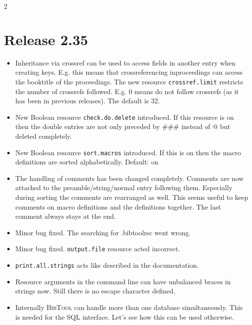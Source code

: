 \documentclass[11pt,a4paper]{scrartcl}
\newcommand\rsc[1]{\texttt{#1}}
\newcommand\File[1]{\textsf{#1}}
\newcommand\BibTool{\textsc{BibTool}}
\newenvironment{Releases}{\begin{multicols}2\RaggedRight}{\end{multicols}}
\newenvironment{Release}[2]{%
  \def\tmp{#2}%
  \section*{Release #1 \ifx\tmp\empty\else{\normalsize[#2]}\fi}
  \begin{itemize}
}{\end{itemize}}
\newenvironment{Fix}[1]{\item }{}
\newenvironment{New}[1]{\item }{}
\newenvironment{Update}[1]{\item }{}
\begin{document}
\begin{Releases}
 \begin{Release}{2.35}{}
  \begin{Update}{gene}
    Inheritance via crossref can be used to access fields in another
    entry when creating keys. E.g. this means that crossreferencing
    inproceedings can access the booktitle of the proceedings. The new
    resource \rsc{crossref.limit} restricts the number of crossrefs
    followed. E.g. 0 means do not follow crossrefs (as it has been in
    previous releases). The default is 32.
  \end{Update}
  \begin{New}{gene}
    New Boolean resource \rsc{check.do.delete} introduced. If this
    resource is on then the double entries are not only preceded by
    \#\#\# instead of @ but deleted completely.
  \end{New}
  \begin{New}{gene}
    New Boolean resource \rsc{sort.macros} introduced. If this is on
    then the macro definitions are sorted alphabetically. Default: on
  \end{New}
  \begin{Update}{gene}
    The handling of comments has been changed completely. Comments are
    now attached to the preamble/string/normal entry following them.
    Especially during sorting the comments are rearranged as well.
    This seems useful to keep comments on macro definitions and the
    definitions together. The last comment always stays at the end.
  \end{Update}
  \begin{Fix}{gene}
    Minor bug fixed. The searching for \File{.bibtoolrsc} went wrong.
  \end{Fix}
  \begin{Fix}{gene}
    Minor bug fixed. \rsc{output.file} resource acted incorrect.
  \end{Fix}
  \begin{New}{gene}
    \rsc{print.all.strings} acts like described in the documentation.
  \end{New}
  \begin{Update}{gene}
    Resource arguments in the command line can have unbalanced braces in
    strings now. Still there is no escape character defined.
  \end{Update}
  \begin{Update}{gene}
    Internally \BibTool{} can handle more than one database simultaneously.
    This is needed for the SQL interface. Let's see how this can be used
    otherwise.
  \end{Update}
 \end{Release}


\end{Releases}
\end{document}
